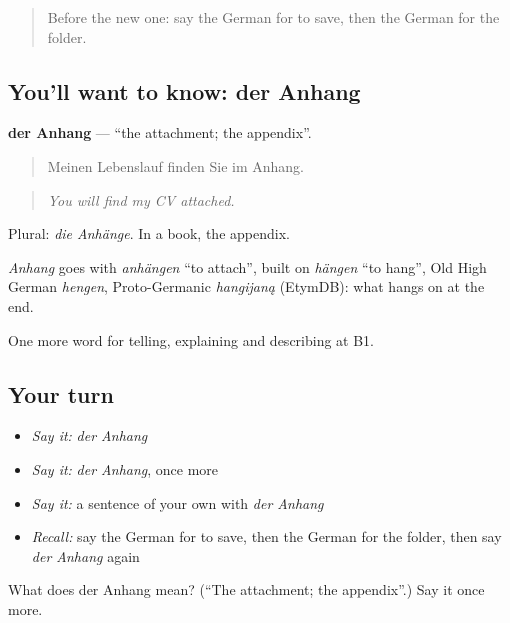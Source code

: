 \begin{quote}
Before the new one: say the German for to save, then the German for the folder.
\end{quote}

\subsection*{You'll want to know: der Anhang}
\textbf{der Anhang} — \textquotedblleft{}the attachment; the appendix\textquotedblright{}.

\begin{quote}
Meinen Lebenslauf finden Sie im Anhang.
\end{quote}

\begin{quote}
\emph{You will find my CV attached.}
\end{quote}

Plural: \emph{die Anhänge}. In a book, the appendix.

\begin{cousinweb}
\emph{Anhang} goes with \emph{anhängen} \textquotedblleft{}to attach\textquotedblright{}, built on \emph{hängen} \textquotedblleft{}to hang\textquotedblright{}, Old High German \emph{hengen}, Proto-Germanic \emph{hangijaną} (EtymDB): what hangs on at the end.
\end{cousinweb}

\begin{grammarlens}[title={What you've built}]
One more word for telling, explaining and describing at B1.
\end{grammarlens}

\subsection*{Your turn}
\begin{itemize}
\raggedright
  \item \emph{Say it:} \emph{der Anhang}
  \item \emph{Say it:} \emph{der Anhang}, once more
  \item \emph{Say it:} a sentence of your own with \emph{der Anhang}
  \item \emph{Recall:} say the German for to save, then the German for the folder, then say \emph{der Anhang} again
\end{itemize}

\begin{tcolorbox}[breakable,colback=teal!4,colframe=teal!35!black,title={Before you move on}]
What does der Anhang mean? (\textquotedblleft{}The attachment; the appendix\textquotedblright{}.) Say it once more.
\end{tcolorbox}
